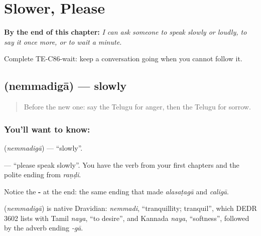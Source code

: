 
\chapter{Slower, Please}
\label{ch:te-slower-please}

\begin{chapteropening}
\textbf{By the end of this chapter:} \emph{I can ask someone to speak slowly or loudly, to say it once more, or to wait a minute.}

Complete TE-C86-wait: keep a conversation going when you cannot follow it.
\end{chapteropening}

\section[\texorpdfstring{\te{నెమ్మదిగా} (nemmadigā)}{నెమ్మదిగా (nemmadigā)}]{ (nemmadigā) — slowly}

\label{lesson:TE-C86-slowly}



\begin{quote}
Before the new one: say the Telugu for anger, then the Telugu for sorrow.
\end{quote}

\subsection*{You'll want to know: }
\textbf{} (\emph{nemmadigā}) — \textquotedblleft{}slowly\textquotedblright{}.

\textbf{ } — \textquotedblleft{}please speak slowly\textquotedblright{}. You have the verb from your first chapters and the polite ending from \emph{raṇḍi}.

Notice the \textbf{-} at the end: the same ending that made \emph{alasaṭagā} and \emph{caligā}.

\begin{cousinweb}
\textbf{} (\emph{nemmadigā}) is native Dravidian: \emph{nemmadi}, \textquotedblleft{}tranquillity; tranquil\textquotedblright{}, which DEDR 3602 lists with Tamil \emph{naya}, \textquotedblleft{}to desire\textquotedblright{}, and Kannada \emph{naya}, \textquotedblleft{}softness\textquotedblright{}, followed by the adverb ending \emph{-gā}.
\end{cousinweb}

